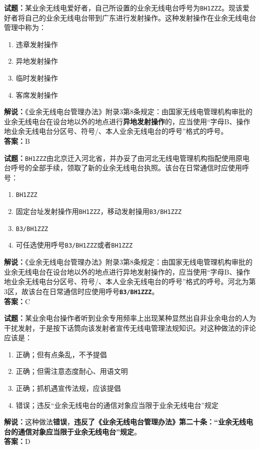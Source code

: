 \documentclass{ctexbook}
\begin{document}
\bigskip

\noindent\textbf{试题：}某业余无线电爱好者，自己所设置的业余无线电台呼号为\texttt{BH1ZZZ}。现该爱好者将自己的业余无线电台带到广东进行发射操作。这种发射操作在业余无线电台管理中称为：
\begin{enumerate}[leftmargin=3em]
  \item 违章发射操作
  \item 异地发射操作
  \item 临时发射操作
  \item 客席发射操作
\end{enumerate}
\noindent\textbf{解说：}《业余无线电台管理办法》附录3第8条规定：由国家无线电管理机构审批的业余无线电台在设台地以外的地点进行\textbf{异地发射操作}的，应当使用“字母B、操作地业余无线电台分区号、符号/、本人业余无线电台的呼号”格式的呼号。\\\noindent\textbf{答案：}B

\bigskip

\noindent\textbf{试题：}\texttt{BH1ZZZ}由北京迁入河北省，并办妥了由河北无线电管理机构指配使用原电台呼号的全部手续，领取了新的业余无线电台执照。该台在日常通信时应使用呼号：
\begin{enumerate}[leftmargin=3em]
  \item \texttt{BH1ZZZ}
  \item 固定台址发射操作用\texttt{BH1ZZZ}，移动发射操用\texttt{B3/BH1ZZZ}
  \item \texttt{B3/BH1ZZZ}
  \item 可任选使用呼号\texttt{B3/BH1ZZZ}或者\texttt{BH1ZZZ}
\end{enumerate}
\noindent\textbf{解说：}《业余无线电台管理办法》附录3第8条规定：由国家无线电管理机构审批的业余无线电台在设台地以外的地点进行异地发射操作的，应当使用“字母B、操作地业余无线电台分区号、符号/、本人业余无线电台的呼号”格式的呼号。河北为第3区，故该台在日常通信时应使用呼号\texttt{\textbf{B3/BH1ZZZ}}。\\\noindent\textbf{答案：}C

\bigskip

\noindent\textbf{试题：}某业余电台操作者听到业余专用频率上出现某种显然出自非业余电台的人为干扰发射，于是按下话筒向该发射者宣传无线电管理法规知识。对这种做法的评论应该是：
\begin{enumerate}[leftmargin=3em]
  \item 正确；但有点条乱，不予提倡
  \item 正确；但需注意态度耐心、用语文明
  \item 正确；抓机遇宣传法规，应该提倡
  \item 错误；违反“业余无线电台的通信对象应当限于业余无线电台”规定
\end{enumerate}
\noindent\textbf{解说：}这种做法\textbf{错误}，\textbf{违反了《业余无线电台管理办法》第二十条：“业余无线电台的通信对象应当限于业余无线电台”规定}。\\\noindent\textbf{答案：}D
\end{document}
